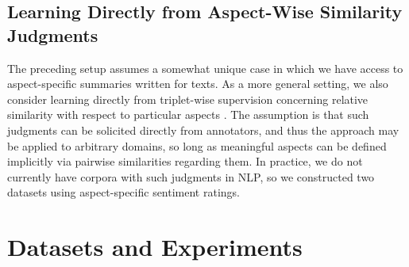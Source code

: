\documentclass[11pt,a4paper]{article}
\begin{document}

\subsection{Learning Directly from Aspect-Wise Similarity Judgments}
The preceding setup assumes a somewhat unique case in which we have access to aspect-specific summaries written for texts. As a more general setting, we also consider learning directly from triplet-wise supervision concerning relative similarity with respect to particular aspects \cite{amid2015multiview,veit2017conditional,wilber2014cost}. The assumption is that such judgments can be solicited directly from annotators, and thus the approach may be applied to arbitrary domains, so long as meaningful aspects can be defined implicitly via pairwise similarities regarding them. In practice, we do not currently have corpora with such judgments in NLP, so we constructed two datasets using aspect-specific sentiment ratings. %





\section{Datasets and Experiments}
\label{section:experiments}
\end{document}
